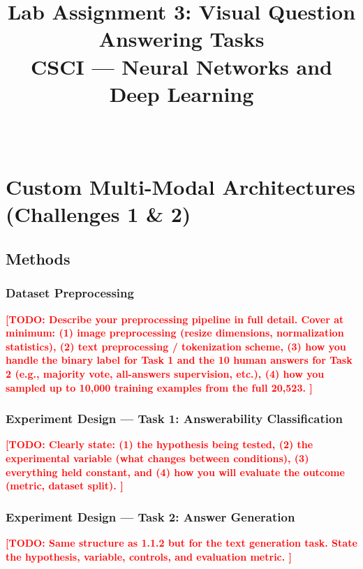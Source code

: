 \documentclass[11pt]{article}
\title{
  \textbf{Lab Assignment 3: Visual Question Answering Tasks}\\
  \large CSCI \todo{4922 or 5922} — Neural Networks and Deep Learning
}
\author{
  \todo{Your Full Name} \\
}
\date{}
\newcommand{\todo}[1]{\textcolor{red}{\textbf{[TODO: #1]}}}
\begin{document}
\maketitle

\section{Custom Multi-Modal Architectures (Challenges 1 \& 2)}

\subsection{Methods}

\subsubsection{Dataset Preprocessing}

\todo{
  Describe your preprocessing pipeline in full detail. Cover at minimum:
  (1) image preprocessing (resize dimensions, normalization statistics),
  (2) text preprocessing / tokenization scheme,
  (3) how you handle the binary label for Task 1 and the 10 human answers
      for Task 2 (e.g., majority vote, all-answers supervision, etc.),
  (4) how you sampled up to 10,000 training examples from the full 20,523.
}

\subsubsection{Experiment Design — Task 1: Answerability Classification}

\todo{
  Clearly state: (1) the hypothesis being tested, (2) the experimental
  variable (what changes between conditions), (3) everything held constant,
  and (4) how you will evaluate the outcome (metric, dataset split).
}

\subsubsection{Experiment Design — Task 2: Answer Generation}

\todo{
  Same structure as 1.1.2 but for the text generation task. State the
  hypothesis, variable, controls, and evaluation metric.
}
\end{document}
